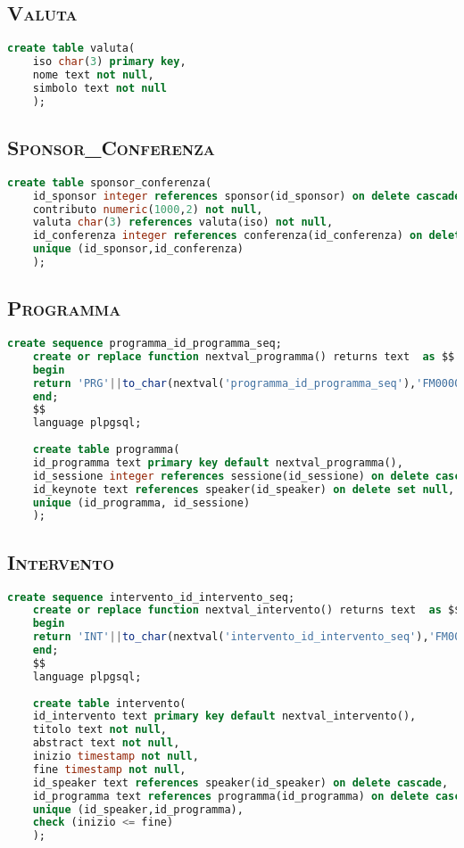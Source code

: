 \subsection{\textsc{Valuta}}
\begin{lstlisting}[language=SQL,style=mystyle]
	create table valuta(
	iso char(3) primary key,
	nome text not null,
	simbolo text not null
	);
\end{lstlisting}
\subsection{\textsc{Sponsor\_Conferenza}}
\begin{lstlisting}[language=SQL,style=mystyle]
	create table sponsor_conferenza(
	id_sponsor integer references sponsor(id_sponsor) on delete cascade not null,
	contributo numeric(1000,2) not null,
	valuta char(3) references valuta(iso) not null,
	id_conferenza integer references conferenza(id_conferenza) on delete cascade not null,
	unique (id_sponsor,id_conferenza) 
	);
\end{lstlisting}
\subsection{\textsc{Programma}}
\begin{lstlisting}[language=SQL,style=mystyle]
	create sequence programma_id_programma_seq;
	create or replace function nextval_programma() returns text  as $$
	begin
	return 'PRG'||to_char(nextval('programma_id_programma_seq'),'FM0000');
	end;
	$$
	language plpgsql;
	
	create table programma(
	id_programma text primary key default nextval_programma(),
	id_sessione integer references sessione(id_sessione) on delete cascade not null,
	id_keynote text references speaker(id_speaker) on delete set null,
	unique (id_programma, id_sessione)
	);
\end{lstlisting}
\subsection{\textsc{Intervento}}
\begin{lstlisting}[language=SQL,style=mystyle]
	create sequence intervento_id_intervento_seq;
	create or replace function nextval_intervento() returns text  as $$
	begin
	return 'INT'||to_char(nextval('intervento_id_intervento_seq'),'FM0000');
	end;
	$$
	language plpgsql;
	
	create table intervento(
	id_intervento text primary key default nextval_intervento(),
	titolo text not null,
	abstract text not null,
	inizio timestamp not null,
	fine timestamp not null,
	id_speaker text references speaker(id_speaker) on delete cascade,
	id_programma text references programma(id_programma) on delete cascade not null,
	unique (id_speaker,id_programma), 
	check (inizio <= fine) 
	);
\end{lstlisting}
